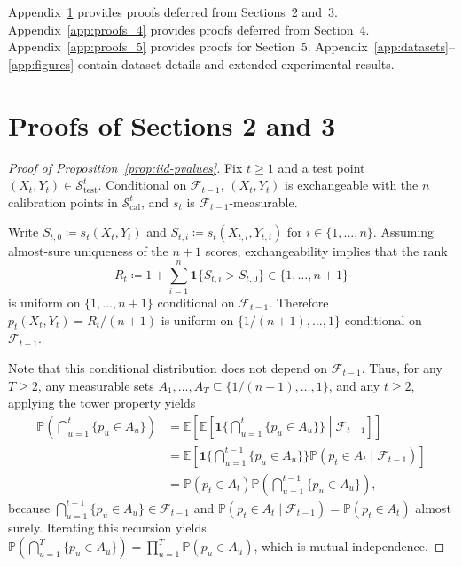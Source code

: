 \documentclass{uai2026} %
\newcommand{\1}{\mathbf{1}}
\newcommand{\ind}[1]{\mathbf{1}\{#1\}}
\newcommand{\prob}{\mathbb{P}}
\newcommand{\expec}{\mathbb{E}}
\newcommand{\test}{\mathrm{test}}
\newcommand{\scal}{\mathcal{S}}
\newcommand{\F}{\mathcal{F}}
\newcommand{\cali}{\mathrm{cal}}
\newcommand{\scalcal}{\scal_{\cali}}
\newcommand{\scaltest}{\scal_{\test}}
\begin{document}
Appendix~\ref{app:proofs_2_3} provides proofs deferred from Sections~2 and~3. Appendix~\ref{app:proofs_4} provides proofs deferred from Section~4. Appendix~\ref{app:proofs_5} provides proofs for Section~5. Appendix~\ref{app:datasets}--\ref{app:figures} contain dataset details and extended experimental results.

\section{Proofs of Sections 2 and 3}
\label{app:proofs_2_3}

\begin{proof}[Proof of Proposition~\ref{prop:iid-pvalues}]
  Fix $t\ge 1$ and a test point $(X_t,Y_t)\in\scaltest^t$.
  Conditional on $\F_{t-1}$, $(X_t,Y_t)$ is exchangeable with the $n$ calibration points in $\scalcal^t$, and $s_t$ is $\F_{t-1}$-measurable.

  Write $S_{t,0}\coloneqq s_t(X_t,Y_t)$ and $S_{t,i}\coloneqq s_t(X_{t,i},Y_{t,i})$ for $i\in\{1,\dots,n\}$.
  Assuming almost-sure uniqueness of the $n+1$ scores, exchangeability implies that the rank
  \begin{equation*}
    R_t
    \coloneqq
    1+\sum_{i=1}^{n}\ind{S_{t,i}>S_{t,0}}
    \in\{1,\dots,n+1\}
  \end{equation*}
  is uniform on $\{1,\dots,n+1\}$ conditional on $\F_{t-1}$.
  Therefore $p_t(X_t,Y_t)=R_t/(n+1)$ is uniform on $\{1/(n+1),\dots,1\}$ conditional on $\F_{t-1}$.

  Note that this conditional distribution does not depend on $\F_{t-1}$. Thus, for any $T\ge 2$, any measurable sets $A_1,\dots,A_T\subseteq\{1/(n+1),\dots,1\}$, and any $t\ge 2$, applying the tower property yields
  \begin{equation*}
    \begin{aligned}
      \prob\left(\bigcap_{u=1}^{t}\{p_u\in A_u\}\right)
      &= \expec\left[ \expec\left[ \ind{\bigcap_{u=1}^{t}\{p_u\in A_u\}} \middle| \F_{t-1} \right] \right] \\
      &= \expec\left[\ind{\bigcap_{u=1}^{t-1}\{p_u\in A_u\}}\prob(p_t\in A_t\mid \F_{t-1})\right] \\
      &= \prob(p_t\in A_t)\prob\left(\bigcap_{u=1}^{t-1}\{p_u\in A_u\}\right),
    \end{aligned}
  \end{equation*}
  because $\bigcap_{u=1}^{t-1}\{p_u\in A_u\}\in\F_{t-1}$ and $\prob(p_t\in A_t\mid \F_{t-1})=\prob(p_t\in A_t)$ almost surely.
  Iterating this recursion yields $\prob(\bigcap_{u=1}^{T}\{p_u\in A_u\})=\prod_{u=1}^{T}\prob(p_u\in A_u)$, which is mutual independence.
\end{proof}
\end{document}
